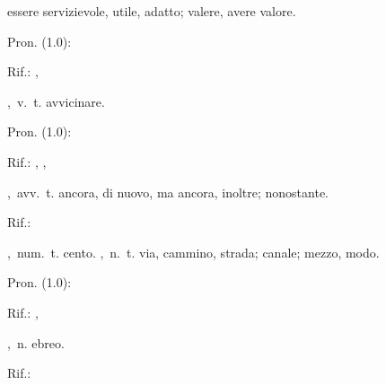 essere servizievole, utile, adatto; valere, avere valore.
\begin{subvocedue}
\item[Pron. (1.0):] 
\item[Rif.:] , 
\end{subvocedue}
,\ v.\ t.
avvicinare.
\begin{subvocedue}
\item[Pron. (1.0):] 
\item[Rif.:] , , 
\end{subvocedue}
,\ avv.\ t.
ancora, di nuovo, ma ancora, inoltre; nonostante.
\begin{subvocedue}
\item[Rif.:] 
\end{subvocedue}
,\ num.\ t.
cento.
,\ n.\ t.
via, cammino, strada; canale; mezzo, modo.
\begin{subvocedue}
\item[Pron. (1.0):] 
\item[Rif.:] , 
\end{subvocedue}
,\ n.
ebreo.
\begin{subvocedue}
\item[Rif.:] 
\end{subvocedue}
